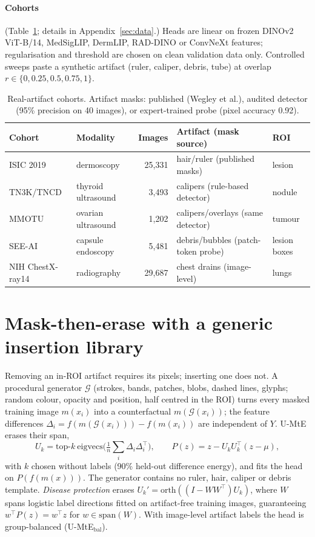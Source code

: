 \documentclass{article}
\begin{document}
\paragraph{Cohorts} (Table~\ref{m:tab:data}; details in Appendix~\ref{sec:data}.) Heads are linear on frozen
DINOv2 ViT-B/14, MedSigLIP, DermLIP, RAD-DINO or ConvNeXt features; regularisation and threshold are chosen on clean
validation data only. Controlled sweeps paste a synthetic artifact (ruler, caliper, debris, tube) at overlap
$r\in\{0,0.25,0.5,0.75,1\}$.
\begin{table}[t]\centering\small
\caption{Real-artifact cohorts. Artifact masks: published (Wegley et al.), audited detector (95\% precision on 40
images), or expert-trained probe (pixel accuracy 0.92).}\label{m:tab:data}
\begin{tabular}{llrll}\toprule
Cohort & Modality & Images & Artifact (mask source) & ROI \\\midrule
ISIC 2019 & dermoscopy & 25{,}331 & hair/ruler (published masks) & lesion \\
TN3K/TNCD & thyroid ultrasound & 3{,}493 & calipers (rule-based detector) & nodule \\
MMOTU & ovarian ultrasound & 1{,}202 & calipers/overlays (same detector) & tumour \\
SEE-AI & capsule endoscopy & 5{,}481 & debris/bubbles (patch-token probe) & lesion boxes \\
NIH ChestX-ray14 & radiography & 29{,}687 & chest drains (image-level) & lungs \\\bottomrule
\end{tabular}\end{table}

\section{Mask-then-erase with a generic insertion library}\label{m:method}\label{sec:i2e}
Removing an in-ROI artifact requires its pixels; inserting one does not. A procedural generator $\mathcal{G}$
(strokes, bands, patches, blobs, dashed lines, glyphs; random colour, opacity and position, half centred in the ROI)
turns every masked training image $m(x_i)$ into a counterfactual $m(\mathcal{G}(x_i))$; the feature differences
$\Delta_i=f(m(\mathcal{G}(x_i)))-f(m(x_i))$ are independent of $Y$. U-MtE erases their span,
\begin{equation}
U_k=\mathrm{top}\text{-}k\ \mathrm{eigvecs}\big(\tfrac1n\textstyle\sum_i\Delta_i\Delta_i^\top\big),\qquad P(z)=z-U_kU_k^\top(z-\mu),
\end{equation}
with $k$ chosen without labels (90\% held-out difference energy), and fits the head on $P(f(m(x)))$. The generator
contains no ruler, hair, caliper or debris template. \emph{Disease protection} erases
$U_k'=\mathrm{orth}((I-WW^\top)U_k)$, where $W$ spans logistic label directions fitted on artifact-free training
images, guaranteeing $w^\top P(z)=w^\top z$ for $w\in\mathrm{span}(W)$. With image-level artifact labels the head is
group-balanced (U-MtE$_{\text{bal}}$).
\end{document}
